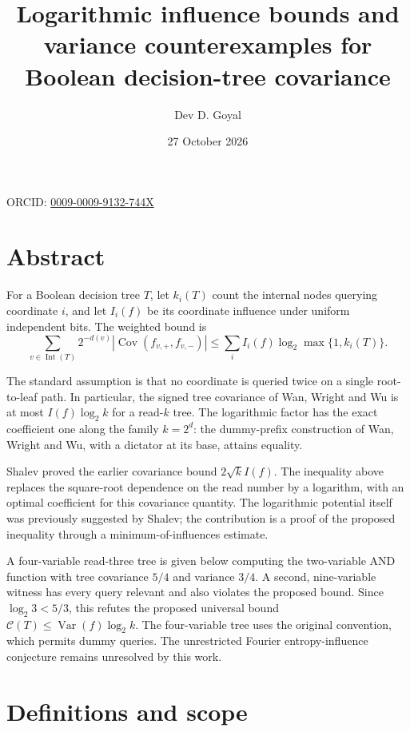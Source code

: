 \documentclass[
  american,
  11pt,
]{article}
\title{Logarithmic influence bounds and variance counterexamples for
Boolean decision-tree covariance}
\author{Dev D. Goyal}
\date{27 October 2026}
\begin{document}
\maketitle

\begin{center}
\small ORCID: \href{https://orcid.org/0009-0009-9132-744X}{0009-0009-9132-744X}
\end{center}

\section*{Abstract}\label{abstract}

For a Boolean decision tree \(T\), let \(k_i(T)\) count the internal
nodes querying coordinate \(i\), and let \(I_i(f)\) be its coordinate
influence under uniform independent bits. The weighted bound is \[
\sum_{v\in\operatorname{Int}(T)}2^{-d(v)}
 \left|\operatorname{Cov}(f_{v,+},f_{v,-})\right|
\leq \sum_i I_i(f)\log_2\max\{1,k_i(T)\}.
\tag{A}
\]

The standard assumption is that no coordinate is queried twice on a
single root-to-leaf path. In particular, the signed tree covariance of
Wan, Wright and Wu is at most \(I(f)\log_2 k\) for a read-\(k\) tree.
The logarithmic factor has the exact coefficient one along the family
\(k=2^d\): the dummy-prefix construction of Wan, Wright and Wu, with a
dictator at its base, attains equality.

Shalev proved the earlier covariance bound \(2\sqrt{k}I(f)\). The
inequality above replaces the square-root dependence on the read number
by a logarithm, with an optimal coefficient for this covariance
quantity. The logarithmic potential itself was previously suggested by
Shalev; the contribution is a proof of the proposed inequality through a
minimum-of-influences estimate.

A four-variable read-three tree is given below computing the two-variable AND
function with tree covariance \(5/4\) and variance \(3/4\). A second,
nine-variable witness has every query relevant and also violates the
proposed bound. Since \(\log_2 3<5/3\), this refutes the proposed
universal bound \(\mathcal C(T)\leq\operatorname{Var}(f)\log_2 k\). The
four-variable tree uses the original convention, which permits dummy
queries. The unrestricted Fourier entropy-influence conjecture remains
unresolved by this work.

\section{Definitions and scope}\label{definitions-and-scope}
\end{document}
